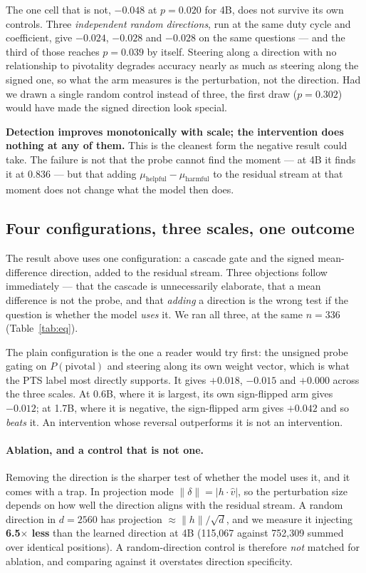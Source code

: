 \documentclass{article}
\begin{document}
The one cell that is not, $-0.048$ at $p{=}0.020$ for 4B, does not survive
its own controls. Three \emph{independent random directions}, run at the
same duty cycle and coefficient, give $-0.024$, $-0.028$ and $-0.028$ on
the same questions --- and the third of those reaches $p{=}0.039$ by
itself. Steering along a direction with no relationship to pivotality
degrades accuracy nearly as much as steering along the signed one, so what
the arm measures is the perturbation, not the direction. Had we drawn a
single random control instead of three, the first draw ($p{=}0.302$) would
have made the signed direction look special.

\textbf{Detection improves monotonically with scale; the intervention does
nothing at any of them.} This is the cleanest form the negative result
could take. The failure is not that the probe cannot find the moment ---
at 4B it finds it at 0.836 --- but that adding
$\mu_{\text{helpful}} - \mu_{\text{harmful}}$ to the residual stream at
that moment does not change what the model then does.

\subsection{Four configurations, three scales, one outcome}
\label{sec:configs}

The result above uses one configuration: a cascade gate and the signed
mean-difference direction, added to the residual stream. Three objections
follow immediately --- that the cascade is unnecessarily elaborate, that a
mean difference is not the probe, and that \emph{adding} a direction is the
wrong test if the question is whether the model \emph{uses} it. We ran all
three, at the same $n{=}336$ (Table~\ref{tab:eq}).

The plain configuration is the one a reader would try first: the unsigned
probe gating on $P(\text{pivotal})$ and steering along its own weight
vector, which is what the PTS label most directly supports. It gives
$+0.018$, $-0.015$ and $+0.000$ across the three scales. At 0.6B, where it
is largest, its own sign-flipped arm gives $-0.012$; at 1.7B, where it is
negative, the sign-flipped arm gives $+0.042$ and so \emph{beats} it. An
intervention whose reversal outperforms it is not an intervention.

\paragraph{Ablation, and a control that is not one.} Removing the
direction is the sharper test of whether the model uses it, and it comes
with a trap. In projection mode $\|\delta\| = |h \cdot \hat{v}|$, so the
perturbation size depends on how well the direction aligns with the
residual stream. A random direction in $d{=}2560$ has projection
$\approx \|h\|/\sqrt{d}$, and we measure it injecting \textbf{6.5$\times$
less} than the learned direction at 4B (115{,}067 against 752{,}309 summed
over identical positions). A random-direction control is therefore
\emph{not} matched for ablation, and comparing against it overstates
direction specificity.
\end{document}
